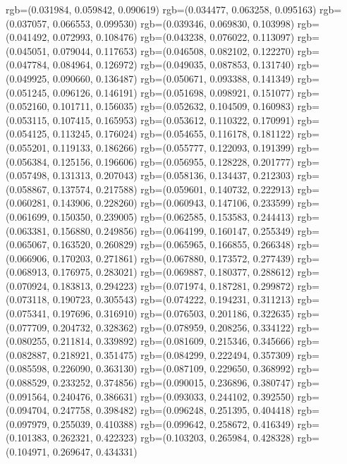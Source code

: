 {{{					rgb=(0.031984, 0.059842, 0.090619)
					rgb=(0.034477, 0.063258, 0.095163)
					rgb=(0.037057, 0.066553, 0.099530)
					rgb=(0.039346, 0.069830, 0.103998)
					rgb=(0.041492, 0.072993, 0.108476)
					rgb=(0.043238, 0.076022, 0.113097)
					rgb=(0.045051, 0.079044, 0.117653)
					rgb=(0.046508, 0.082102, 0.122270)
					rgb=(0.047784, 0.084964, 0.126972)
					rgb=(0.049035, 0.087853, 0.131740)
					rgb=(0.049925, 0.090660, 0.136487)
					rgb=(0.050671, 0.093388, 0.141349)
					rgb=(0.051245, 0.096126, 0.146191)
					rgb=(0.051698, 0.098921, 0.151077)
					rgb=(0.052160, 0.101711, 0.156035)
					rgb=(0.052632, 0.104509, 0.160983)
					rgb=(0.053115, 0.107415, 0.165953)
					rgb=(0.053612, 0.110322, 0.170991)
					rgb=(0.054125, 0.113245, 0.176024)
					rgb=(0.054655, 0.116178, 0.181122)
					rgb=(0.055201, 0.119133, 0.186266)
					rgb=(0.055777, 0.122093, 0.191399)
					rgb=(0.056384, 0.125156, 0.196606)
					rgb=(0.056955, 0.128228, 0.201777)
					rgb=(0.057498, 0.131313, 0.207043)
					rgb=(0.058136, 0.134437, 0.212303)
					rgb=(0.058867, 0.137574, 0.217588)
					rgb=(0.059601, 0.140732, 0.222913)
					rgb=(0.060281, 0.143906, 0.228260)
					rgb=(0.060943, 0.147106, 0.233599)
					rgb=(0.061699, 0.150350, 0.239005)
					rgb=(0.062585, 0.153583, 0.244413)
					rgb=(0.063381, 0.156880, 0.249856)
					rgb=(0.064199, 0.160147, 0.255349)
					rgb=(0.065067, 0.163520, 0.260829)
					rgb=(0.065965, 0.166855, 0.266348)
					rgb=(0.066906, 0.170203, 0.271861)
					rgb=(0.067880, 0.173572, 0.277439)
					rgb=(0.068913, 0.176975, 0.283021)
					rgb=(0.069887, 0.180377, 0.288612)
					rgb=(0.070924, 0.183813, 0.294223)
					rgb=(0.071974, 0.187281, 0.299872)
					rgb=(0.073118, 0.190723, 0.305543)
					rgb=(0.074222, 0.194231, 0.311213)
					rgb=(0.075341, 0.197696, 0.316910)
					rgb=(0.076503, 0.201186, 0.322635)
					rgb=(0.077709, 0.204732, 0.328362)
					rgb=(0.078959, 0.208256, 0.334122)
					rgb=(0.080255, 0.211814, 0.339892)
					rgb=(0.081609, 0.215346, 0.345666)
					rgb=(0.082887, 0.218921, 0.351475)
					rgb=(0.084299, 0.222494, 0.357309)
					rgb=(0.085598, 0.226090, 0.363130)
					rgb=(0.087109, 0.229650, 0.368992)
					rgb=(0.088529, 0.233252, 0.374856)
					rgb=(0.090015, 0.236896, 0.380747)
					rgb=(0.091564, 0.240476, 0.386631)
					rgb=(0.093033, 0.244102, 0.392550)
					rgb=(0.094704, 0.247758, 0.398482)
					rgb=(0.096248, 0.251395, 0.404418)
					rgb=(0.097979, 0.255039, 0.410388)
					rgb=(0.099642, 0.258672, 0.416349)
					rgb=(0.101383, 0.262321, 0.422323)
					rgb=(0.103203, 0.265984, 0.428328)
					rgb=(0.104971, 0.269647, 0.434331)
}}}
